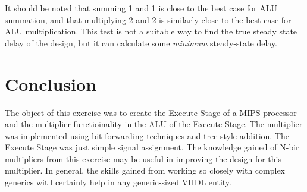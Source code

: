 \documentclass[CMPE]{KGCOEReport}
\begin{document}
It should be noted that summing 1 and 1 is close to the best case for ALU
summation, and that multiplying 2 and 2 is similarly close to the best case for
ALU multiplication. This test is not a suitable way to find the true steady
state delay of the design, but it can calculate some \textit{minimum}
steady-state delay.

\section*{Conclusion}

The object of this exercise was to create the Execute Stage of a MIPS processor
and the multiplier functioinality in the ALU of the Execute Stage. The
multiplier was implemented using bit-forwarding techniques and tree-style
addition. The Execute Stage was just simple signal assignment. The knowledge
gained of N-bir multipliers from this exercise may be useful in improving the
design for this multiplier. In general, the skills gained from working so
closely with complex generics witll certainly help in any generic-sized VHDL
entity.


\end{document}
